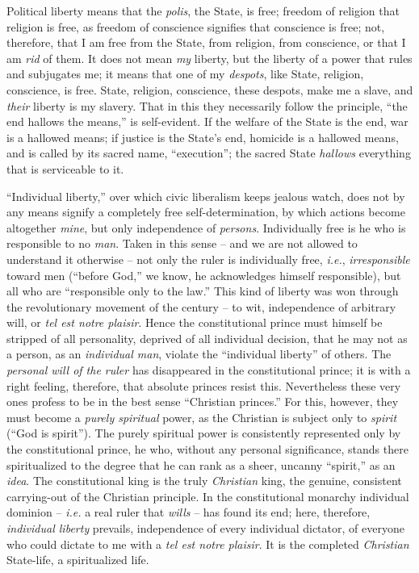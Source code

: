 \documentclass[12pt,a4paper]{book}
\begin{document}
Political liberty means that the \textit{polis}, the State, is free; freedom 
of religion that religion is free, as freedom of conscience signifies that 
conscience is free; not, therefore, that I am free from the State, from 
religion, from conscience, or that I am \textit{rid} of them. It does not mean 
\textit{my} liberty, but the liberty of a power that rules and subjugates me; 
it means that one of my \textit{despots}, like State, religion, conscience, is 
free. State, religion, conscience, these despots, make me a slave, and 
\textit{their} liberty is my slavery. That in this they necessarily follow the 
principle, ``the end hallows the means,'' is self-evident. If the welfare of 
the State is the end, war is a hallowed means; if justice is the State's end, 
homicide is a hallowed means, and is called by its sacred name, 
``execution''; the sacred State \textit{hallows} everything that is 
serviceable to it.

``Individual liberty,'' over which civic liberalism keeps jealous watch, 
does not by any means signify a completely free self-determination, by which 
actions become altogether \textit{mine}, but only independence of 
\textit{persons}. Individually free is he who is responsible to no 
\textit{man}. Taken in this sense -- and we are not allowed to understand it 
otherwise -- not only the ruler is individually free, \textit{i.e.}, 
\textit{irresponsible} toward men (``before God,'' we know, he acknowledges 
himself responsible), but all who are ``responsible only to the law.'' This 
kind of liberty was won through the revolutionary movement of the century -- 
to wit, independence of arbitrary will, or \textit{tel est notre plaisir}. 
Hence the constitutional prince must himself be stripped of all personality, 
deprived of all individual decision, that he may not as a person, as an 
\textit{individual man}, violate the ``individual liberty'' of others. The 
\textit{personal will of the ruler} has disappeared in the constitutional 
prince; it is with a right feeling, therefore, that absolute princes resist 
this. Nevertheless these very ones profess to be in the best sense 
``Christian princes.'' For this, however, they must become a \textit{purely 
spiritual} power, as the Christian is subject only to \textit{spirit} (``God 
is spirit''). The purely spiritual power is consistently represented only by 
the constitutional prince, he who, without any personal significance, stands 
there spiritualized to the degree that he can rank as a sheer, uncanny 
``spirit,'' as an \textit{idea}. The constitutional king is the truly 
\textit{Christian} king, the genuine, consistent carrying-out of the Christian 
principle. In the constitutional monarchy individual dominion -- \textit{i.e.} 
a real ruler that \textit{wills} -- has found its end; here, therefore, 
\textit{individual liberty} prevails, independence of every individual 
dictator, of everyone who could dictate to me with a \textit{tel est notre 
plaisir}. It is the completed \textit{Christian} State-life, a spiritualized 
life.
\end{document}
